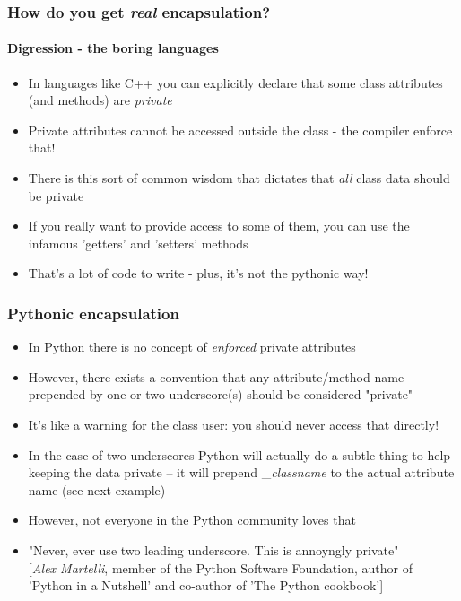 \documentclass[9pt]{beamer}
\begin{document}
\begin{frame}
  \frametitle{How do you get \emph{real} encapsulation?}
  \framesubtitle{Digression - the boring languages}
  
  \begin{itemize}
    \item In languages like C++ you can explicitly declare that some class
          attributes (and methods) are \emph{private}
    \medskip
    \item Private attributes cannot be accessed outside the class - the compiler enforce that!
    \medskip
    \item There is this sort of common wisdom that dictates that \emph{all} class data should be private
    \medskip
    \item If you really want to provide access to some of them, you can use the infamous 'getters' and 'setters' methods
    \medskip
    \item That's a lot of code to write - plus, it's not the pythonic way!
  \end{itemize}
  
\end{frame}


\begin{frame}
  \frametitle{Pythonic encapsulation}
  
  \begin{itemize}
    \item In Python there is no concept of \emph{enforced} private attributes
    \medskip
    \item However, there exists a convention that any attribute/method name prepended by one or two underscore(s) should be considered "private"
    \medskip
    \item It's like a warning for the class user: you should never access that directly!
    \medskip
    \item In the case of two underscores Python will actually do a subtle thing to help keeping the data private -- it will 
          prepend \_\emph{classname} to the actual attribute name (see next example)
    \medskip
    \item However, not everyone in the Python community loves that
    \medskip
    \item "Never, ever use two leading underscore. This is annoyngly private"\\
           \vspace{0.02\textheight}
           \footnotesize [\emph{Alex Martelli}, member of the Python Software Foundation, author of 'Python in a Nutshell' and co-author of 'The Python cookbook']
  \end{itemize}
  
\end{frame}
\end{document}
